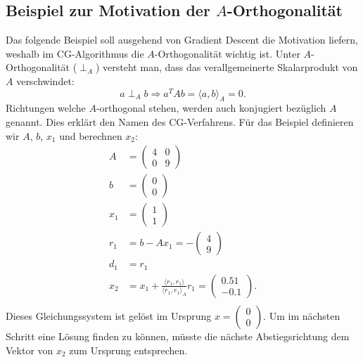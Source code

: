 \subsection{Beispiel zur Motivation der $A$-Orthogonalität} \label{cg:subsec:aortho}
Das folgende Beispiel soll ausgehend von Gradient Descent die Motivation liefern, weshalb im CG-Algorithmus die $A$-Orthogonalität wichtig ist.
Unter $A$-Orthogonalität ($\perp_A$) versteht man, dass das verallgemeinerte Skalarprodukt von $A$ verschwindet:
\begin{equation}
	a \perp_A b \Longrightarrow a^T A b = \langle a , b \rangle_A = 0.
\end{equation}
Richtungen welche $A$-orthogonal stehen, werden auch konjugiert bezüglich $A$ genannt.
Dies erklärt den Namen des CG-Verfahrens.
Für das Beispiel definieren wir $A$, $b$, $x_1$ und berechnen $x_2$:
\begin{align}\nonumber
	A 	&= 		\begin{pmatrix}
				4 & 0\\
				0 & 9 
				\end{pmatrix} \nonumber\\
	b 	&= 		\begin{pmatrix}
				0\\
				0
				\end{pmatrix} \nonumber\\
	x_1 &= 		\begin{pmatrix}
				1\\
				1
				\end{pmatrix} \nonumber\\
	r_1	&= 		b - A x_1 = - 	\begin{pmatrix}
								4\\
								9
								\end{pmatrix} \nonumber\\
	d_1 &= r_1 \nonumber\\
	x_2 &= x_1 + \frac{\langle r_1 , r_1 \rangle}{\langle r_1 , r_1 \rangle_A} r_1 = 	\begin{pmatrix}
																						0.51\\
																						-0.1
																						\end{pmatrix}. \\
\end{align}
Dieses Gleichungssystem ist gelöst im Ursprung $x = \begin{pmatrix}0\\0\end{pmatrix}$.
Um im nächsten Schritt eine Lösung finden zu können, müsste die nächste Abstiegsrichtung dem Vektor von $x_2$ zum Ursprung entsprechen.
